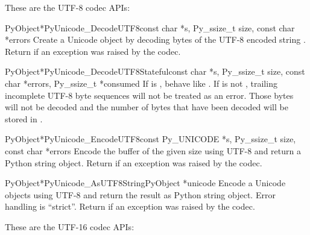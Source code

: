 
These are the UTF-8 codec APIs:

\begin{cfuncdesc}{PyObject*}{PyUnicode_DecodeUTF8}{const char *s,
                                               Py_ssize_t size,
                                               const char *errors}
  Create a Unicode object by decoding  bytes of the UTF-8
  encoded string . Return \NULL{} if an exception was raised
  by the codec.
\end{cfuncdesc}

\begin{cfuncdesc}{PyObject*}{PyUnicode_DecodeUTF8Stateful}{const char *s,
                                               Py_ssize_t size,
                                               const char *errors,
                                               Py_ssize_t *consumed}
  If  is \NULL{}, behave like .
  If  is not \NULL{}, trailing incomplete UTF-8 byte sequences
  will not be treated as an error. Those bytes will not be decoded and the
  number of bytes that have been decoded will be stored in .
\end{cfuncdesc}

\begin{cfuncdesc}{PyObject*}{PyUnicode_EncodeUTF8}{const Py_UNICODE *s,
                                               Py_ssize_t size,
                                               const char *errors}
  Encode the  buffer of the given size using UTF-8
  and return a Python string object.  Return \NULL{} if an exception
  was raised by the codec.
\end{cfuncdesc}

\begin{cfuncdesc}{PyObject*}{PyUnicode_AsUTF8String}{PyObject *unicode}
  Encode a Unicode objects using UTF-8 and return the result as
  Python string object.  Error handling is ``strict''.  Return
  \NULL{} if an exception was raised by the codec.
\end{cfuncdesc}


These are the UTF-16 codec APIs:

